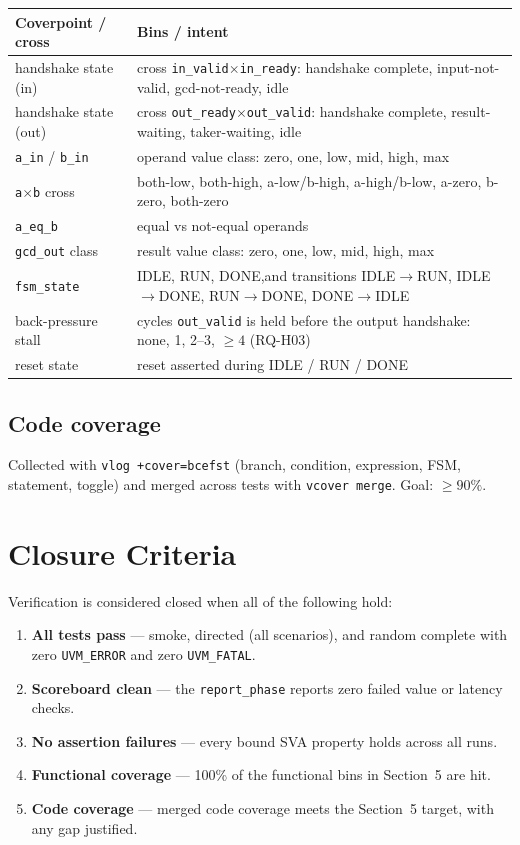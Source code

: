 \documentclass[11pt,a4paper]{article}
\begin{document}
{\begin{table}[H]
\centering
\begin{tabular}{@{}p{4.2cm} p{9.5cm}@{}}
\toprule
\textbf{Coverpoint / cross} & \textbf{Bins / intent} \\
\midrule
handshake state (in) & cross \texttt{in\_valid}$\times$\texttt{in\_ready}: handshake complete, input-not-valid, gcd-not-ready, idle \\
handshake state (out) & cross \texttt{out\_ready}$\times$\texttt{out\_valid}: handshake complete, result-waiting, taker-waiting, idle \\
\texttt{a\_in} / \texttt{b\_in} & operand value class: zero, one, low, mid, high, max \\
\texttt{a}$\times$\texttt{b} cross & both-low, both-high, a-low/b-high, a-high/b-low, a-zero, b-zero, both-zero \\
\texttt{a\_eq\_b} & equal vs not-equal operands \\
\texttt{gcd\_out} class & result value class: zero, one, low, mid, high, max \\
\texttt{fsm\_state} & IDLE, RUN, DONE,and transitions IDLE$\to$RUN, IDLE$\to$DONE, RUN$\to$DONE, DONE$\to$IDLE \\
back-pressure stall & cycles \texttt{out\_valid} is held before the output handshake: none, 1, 2--3, $\geq 4$ (RQ-H03) \\
reset state & reset asserted during IDLE / RUN / DONE \\
\bottomrule
\end{tabular}
\end{table}

\subsection*{Code coverage}
Collected with \texttt{vlog +cover=bcefst} (branch, condition, expression, FSM,
statement, toggle) and merged across tests with \texttt{vcover merge}. Goal:
$\geq 90\%$.


\section{Closure Criteria}

Verification is considered closed when all of the following hold:

\begin{enumerate}
    \item \textbf{All tests pass} --- smoke, directed (all scenarios), and random complete with zero \texttt{UVM\_ERROR} and zero \texttt{UVM\_FATAL}.
    \item \textbf{Scoreboard clean} --- the \texttt{report\_phase} reports zero failed value or latency checks.
    \item \textbf{No assertion failures} --- every bound SVA property holds across all runs.
    \item \textbf{Functional coverage} --- 100\% of the functional bins in Section~5 are hit.
    \item \textbf{Code coverage} --- merged code coverage meets the Section~5 target, with any gap justified.
\end{enumerate}

}
\end{document}
